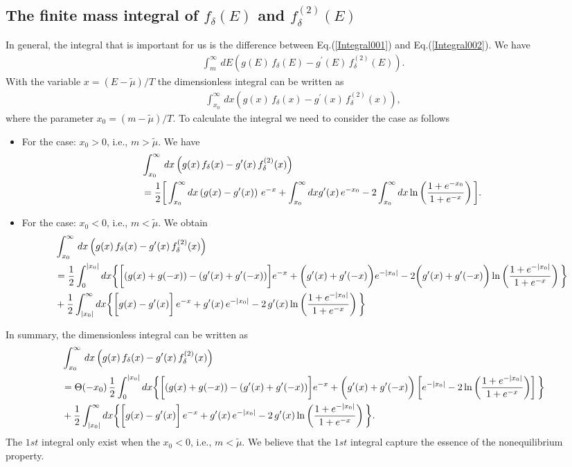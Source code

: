 \documentclass[sn-mathphys,Numbered]{sn-jnl}
\theoremstyle{thmstyleone}%
\theoremstyle{thmstyletwo}%
\theoremstyle{thmstylethree}%
\begin{document}
\subsection{The finite mass integral of $f_\delta(E)$ and $f^{(2)}_\delta(E)$}
In general, the integral that is important for us is the difference between Eq.(\ref{Integral001}) and Eq.(\ref{Integral002}). We have
\begin{align}
\int^{\infty}_{m}\,dE\left(g(E)\,f_\delta(E)-g^\prime(E)\,f^{(2)}_\delta(E)\right).
\end{align}
With the variable $x=(E-\tilde\mu)/T$ the dimensionless integral can be written as
\begin{align}
\int^{\infty}_{x_0}\,dx\left(g(x)\,f_\delta(x)-g^\prime(x)\,f^{(2)}_\delta(x)\right),
\end{align}
where the parameter $x_0=(m-\tilde\mu)/T$. To calculate the integral we need to consider the case as follows
\begin{itemize}
  \item For the case: $x_0>0$, i.e., $m>\tilde\mu$. We have
  \begin{align}
 &\int^{\infty}_{x_0}\,dx\left(g(x)\,f_\delta(x)-g^\prime(x)\,f^{(2)}_\delta(x)\right)\notag\\
  &=\frac{1}{2}\bigg[\int^\infty_{x_0}dx\left(g(x)-g^\prime(x)\right)\,e^{-x}+\int^{\infty}_{x_0}dxg^\prime(x)\,e^{-x_0}-2\int^\infty_{x_0}dx\ln\left(\frac{1+e^{-x_0}}{1+e^{-x}}\right)\bigg].
  \end{align}
  \item For the case: $x_0<0$, i.e., $m<\tilde\mu$. We obtain
  \begin{align}
  &\int^{\infty}_{x_0}\,dx\left(g(x)\,f_\delta(x)-g^\prime(x)\,f^{(2)}_\delta(x)\right)\notag\\
  &=\frac{1}{2}\int^{|x_0|}_0dx\bigg\{\bigg[(g(x)+g(-x))-(g^\prime(x)+g^\prime(-x))\bigg]e^{-x}+\bigg(g^\prime(x)+g^\prime(-x)\bigg)e^{-|x_0|}-2\bigg(g^\prime(x)+g^\prime(-x)\bigg)\ln\left(\frac{1+e^{-|x_0|}}{1+e^{-x}}\right)\bigg\}\notag\\
  &+\frac{1}{2}\int^\infty_{|x_0|}dx\bigg\{\bigg[g(x)-g^\prime(x)\bigg]\,e^{-x}+g^\prime(x)\,e^{-|x_0|}-2\,g^\prime(x)\ln\left(\frac{1+e^{-|x_0|}}{1+e^{-x}}\right)\bigg\}
  \end{align}
\end{itemize}
In summary, the dimensionless integral can be written as
\begin{align}
&\int^{\infty}_{x_0}\,dx\left(g(x)\,f_\delta(x)-g^\prime(x)\,f^{(2)}_\delta(x)\right)\\
&=\Theta(-x_0)\,\frac{1}{2}\int^{|x_0|}_0dx\bigg\{\bigg[(g(x)+g(-x))-(g^\prime(x)+g^\prime(-x))\bigg]e^{-x}+\bigg(g^\prime(x)+g^\prime(-x)\bigg)\left[e^{-|x_0|}-2\ln\left(\frac{1+e^{-|x_0|}}{1+e^{-x}}\right)\right]\bigg\}\notag\\
  &+\frac{1}{2}\int^\infty_{|x_0|}dx\bigg\{\bigg[g(x)-g^\prime(x)\bigg]\,e^{-x}+g^\prime(x)\,e^{-|x_0|}-2\,g^\prime(x)\ln\left(\frac{1+e^{-|x_0|}}{1+e^{-x}}\right)\bigg\}.
\end{align}
The $1st$ integral only exist when the $x_0<0$, i.e., $m<\tilde\mu$. We believe that the $1st$ integral capture the essence of the nonequilibrium property.
\end{document}
